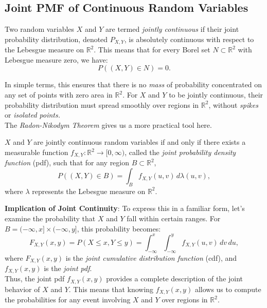 \subsection{Joint PMF of Continuous Random Variables}

\begin{definition}
    Two random variables \( X \) and \( Y \) are termed \textit{jointly continuous} if their joint probability distribution, denoted \( P_{X,Y} \), is absolutely continuous with respect to the Lebesgue measure on \( \mathbb{R}^2 \). This means that for every Borel set \( N \subset \mathbb{R}^2 \) with Lebesgue measure zero, we have:
    \[
    P((X, Y) \in N) = 0.
    \]
\end{definition}

In simple terms, this ensures that there is no \textit{mass} of probability concentrated on any set of points with zero area in \( \mathbb{R}^2 \). For \( X \) and \( Y \) to be jointly continuous, their probability distribution must spread smoothly over regions in \( \mathbb{R}^2 \), without \textit{spikes} or \textit{isolated points.}\\

The \textit{Radon-Nikodym Theorem} gives us a more practical tool here. 

\begin{theorem}
    \( X \) and \( Y \) are jointly continuous random variables if and only if there exists a measurable function \( f_{X,Y} : \mathbb{R}^2 \to [0, \infty) \), called the \textit{joint probability density function} (pdf), such that for any region \( B \subset \mathbb{R}^2 \),
    \[
    P((X, Y) \in B) = \int_{B} f_{X,Y}(u, v) \, d\lambda(u, v),
    \]
    where \( \lambda \) represents the Lebesgue measure on \( \mathbb{R}^2 \).
\end{theorem}

\textbf{Implication of Joint Continuity}: To express this in a familiar form, let’s examine the probability that \( X \) and \( Y \) fall within certain ranges. For \( B = (-\infty, x] \times (-\infty, y] \), this probability becomes:
\[
F_{X,Y}(x, y) = P(X \leq x, Y \leq y) = \int_{-\infty}^{x} \int_{-\infty}^{y} f_{X,Y}(u, v) \, dv \, du,
\]
where \( F_{X,Y}(x, y) \) is the \textit{joint cumulative distribution function} (cdf), and \( f_{X,Y}(x, y) \) is the \textit{joint pdf}. \\

Thus, the joint pdf \( f_{X,Y}(x, y) \) provides a complete description of the joint behavior of \( X \) and \( Y \). This means that knowing \( f_{X,Y}(x, y) \) allows us to compute the probabilities for any event involving \( X \) and \( Y \) over regions in \( \mathbb{R}^2 \). \\


